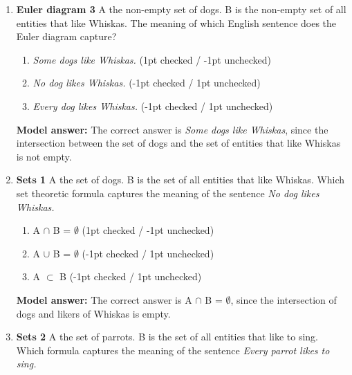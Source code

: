 \documentclass[a4,11pt]{article}
\begin{document}
\begin{enumerate}[leftmargin = 12pt]
{\bf Model answer:}  The correct answer is \textit{No dog likes Whiskas}, since the intersection between the set of dogs and the set of entities that like Whiskas is empty.

\item {\bf Euler diagram 3} A  the non-empty set of dogs. B is the non-empty set of all entities that like Whiskas. The meaning of which English sentence does the Euler diagram capture?


      \begin{enumerate}[noitemsep]
        \item \textit{Some dogs like Whiskas.} (1pt checked / -1pt unchecked)
	\item \textit{No dog likes Whiskas.} (-1pt checked / 1pt unchecked)
        \item \textit{Every dog likes Whiskas.} (-1pt checked / 1pt unchecked)
	\end{enumerate}	

{\bf Model answer:}  The correct answer is \textit{Some dogs like Whiskas}, since the intersection between the set of dogs and the set of entities that like Whiskas is not empty.


\item {\bf Sets 1} A  the set of dogs. B is the set of all entities that like Whiskas. Which set theoretic formula captures the meaning of the sentence \textit{No dog likes Whiskas.}

      \begin{enumerate}[noitemsep]
        \item A $\cap$ B = $\emptyset$ (1pt checked / -1pt unchecked)
	\item A $\cup$ B = $\emptyset$  (-1pt checked / 1pt unchecked)
        \item A $\subset$ B (-1pt checked / 1pt unchecked)
	\end{enumerate}	
	
{\bf Model answer:}  The correct answer is  A $\cap$ B = $\emptyset$, since the intersection of dogs and likers of Whiskas is empty. 


\item {\bf Sets 2} A  the set of parrots. B is the set of all entities that like to sing. Which formula captures the meaning of the sentence \textit{Every parrot likes to sing.}


\end{enumerate}
\end{document}
